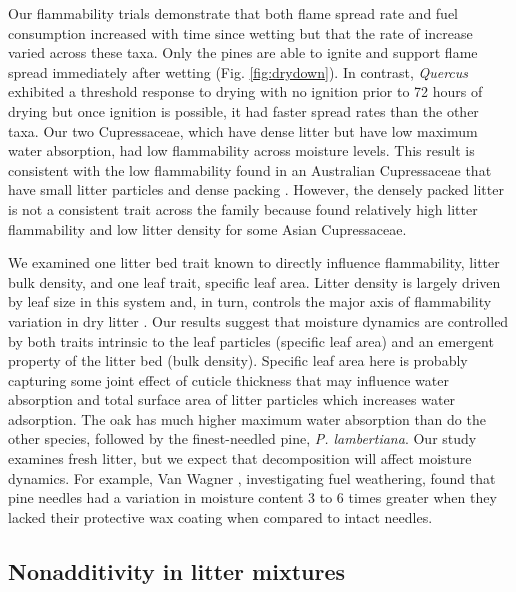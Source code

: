 \documentclass[letterpaper,12pt]{article}
\begin{document}
Our flammability trials demonstrate that both flame spread rate and fuel
consumption increased with time since wetting but that the rate of increase
varied across these taxa. Only the pines are able to ignite and support flame
spread immediately after wetting (Fig. \ref{fig:drydown}). In contrast,
\emph{Quercus} exhibited a threshold response to drying with no ignition prior
to 72 hours of drying but once ignition is possible, it had faster spread rates
than the other taxa. Our two Cupressaceae, which have dense litter but have low
maximum water absorption, had low flammability across moisture levels. This
result is consistent with the low flammability found in an Australian
Cupressaceae that have small litter particles and dense packing
\citep{Scarff+Westoby-2006, Bowman+Haverkamp+etal-2018}. However, the densely
packed litter is not a consistent trait across the family because
\citet{Cornwell+Elvira+etal-2015} found relatively high litter flammability and
low litter density for some Asian Cupressaceae.

We examined one litter bed trait known to directly influence flammability,
litter bulk density, and one leaf trait, specific leaf area. Litter density is
largely driven by leaf size in this system and, in turn, controls the major
axis of flammability variation in dry litter \citep{Magalhaes+Schwilk-2012}.
Our results suggest that moisture dynamics are controlled by both traits
intrinsic to the leaf particles (specific leaf area) and an emergent property
of the litter bed (bulk density). Specific leaf area here is probably capturing
some joint effect of cuticle thickness that may influence water absorption and
total surface area of litter particles which increases water adsorption. The
oak has much higher maximum water absorption than do the other species,
followed by the finest-needled pine, \emph{P. lambertiana}. Our study examines
fresh litter, but we expect that decomposition will affect moisture dynamics.
For example, Van Wagner \citeyear{Van_Wagner-1969}, investigating fuel
weathering, found that pine needles had a variation in moisture content 3 to 6
times greater when they lacked their protective wax coating when compared to
intact needles.

\subsection*{Nonadditivity in litter mixtures}
\end{document}
